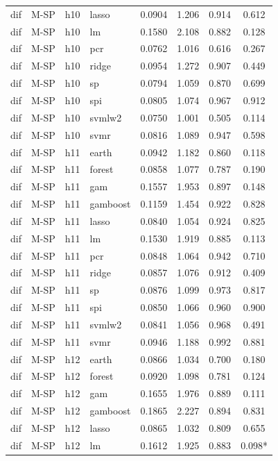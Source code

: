 \begin{ThreePartTable}
\begin{longtable}[t]{llclcccc}
dif & M-SP & h10 & lasso & 0.0904 & 1.206 & 0.914 & 0.612\\
dif & M-SP & h10 & lm & 0.1580 & 2.108 & 0.882 & 0.128\\
dif & M-SP & h10 & pcr & 0.0762 & 1.016 & 0.616 & 0.267\\
dif & M-SP & h10 & ridge & 0.0954 & 1.272 & 0.907 & 0.449\\
dif & M-SP & h10 & sp & 0.0794 & 1.059 & 0.870 & 0.699\\
dif & M-SP & h10 & spi & 0.0805 & 1.074 & 0.967 & 0.912\\
dif & M-SP & h10 & svmlw2 & 0.0750 & 1.001 & 0.505 & 0.114\\
dif & M-SP & h10 & svmr & 0.0816 & 1.089 & 0.947 & 0.598\\
\addlinespace
dif & M-SP & h11 & earth & 0.0942 & 1.182 & 0.860 & 0.118\\
dif & M-SP & h11 & forest & 0.0858 & 1.077 & 0.787 & 0.190\\
dif & M-SP & h11 & gam & 0.1557 & 1.953 & 0.897 & 0.148\\
dif & M-SP & h11 & gamboost & 0.1159 & 1.454 & 0.922 & 0.828\\
dif & M-SP & h11 & lasso & 0.0840 & 1.054 & 0.924 & 0.825\\
dif & M-SP & h11 & lm & 0.1530 & 1.919 & 0.885 & 0.113\\
dif & M-SP & h11 & pcr & 0.0848 & 1.064 & 0.942 & 0.710\\
dif & M-SP & h11 & ridge & 0.0857 & 1.076 & 0.912 & 0.409\\
dif & M-SP & h11 & sp & 0.0876 & 1.099 & 0.973 & 0.817\\
dif & M-SP & h11 & spi & 0.0850 & 1.066 & 0.960 & 0.900\\
dif & M-SP & h11 & svmlw2 & 0.0841 & 1.056 & 0.968 & 0.491\\
dif & M-SP & h11 & svmr & 0.0946 & 1.188 & 0.992 & 0.881\\
\addlinespace
dif & M-SP & h12 & earth & 0.0866 & 1.034 & 0.700 & 0.180\\
dif & M-SP & h12 & forest & 0.0920 & 1.098 & 0.781 & 0.124\\
dif & M-SP & h12 & gam & 0.1655 & 1.976 & 0.889 & 0.111\\
dif & M-SP & h12 & gamboost & 0.1865 & 2.227 & 0.894 & 0.831\\
dif & M-SP & h12 & lasso & 0.0865 & 1.032 & 0.809 & 0.655\\
dif & M-SP & h12 & lm & 0.1612 & 1.925 & 0.883 & 0.098*\\

\end{longtable}
\end{ThreePartTable}
